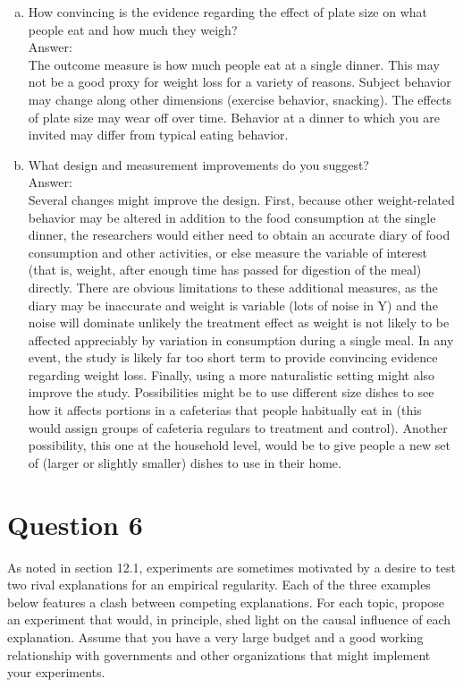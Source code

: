 \documentclass[11pt,notitlepage]{article}\usepackage[]{graphicx}\usepackage[]{color}
\begin{document}
\begin{enumerate}[a)]
\item How convincing is the evidence regarding the effect of plate size on what people eat and how much they weigh?\\
Answer:\\
The outcome measure is how much people eat at a single dinner. This may not be a good proxy for weight loss for a variety of reasons. Subject behavior may change along other dimensions (exercise behavior, snacking). The effects of plate size may wear off over time. Behavior at a dinner to which you are invited may differ from typical eating behavior. 

\item What design and measurement improvements do you suggest?\\
Answer:\\
Several changes might improve the design.  First, because other weight-related behavior may be altered in addition to the food consumption at the single dinner, the researchers would either need to obtain an accurate diary of food consumption and other activities, or else measure the variable of interest (that is, weight, after enough time has passed for digestion of the meal) directly.  There are obvious limitations to these additional measures, as the diary may be inaccurate and weight is variable (lots of noise in Y) and the noise will dominate unlikely the treatment effect as weight is not likely to be affected appreciably by variation in consumption during a single meal. In any event, the study is likely far too short term to provide convincing evidence regarding weight loss.  Finally, using a more naturalistic setting might also improve the study. Possibilities might be to use different size dishes to see how it affects portions in a cafeterias that people habitually eat in (this would assign groups of cafeteria regulars to treatment and control). Another possibility, this one at the household level, would be to give people a new set of (larger or slightly smaller) dishes to use in their home. 
\end{enumerate}

\section*{Question 6}
As noted in section 12.1, experiments are sometimes motivated by a desire to test two rival explanations for an empirical regularity. Each of the three examples below features a clash between competing explanations. For each topic, propose an experiment that would, in principle, shed light on the causal influence of each explanation. Assume that you have a very large budget and a good working relationship with governments and other organizations that might implement your experiments.
\end{document}
